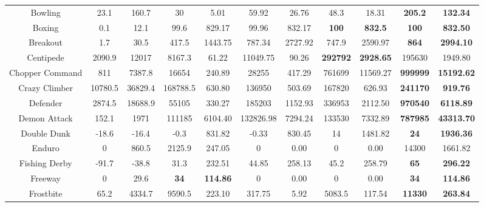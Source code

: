 \documentclass[nohyperref]{article}
\theoremstyle{plain}
\begin{document}
\begin{table}[!hb]
\begin{center}
\begin{tabular}{ |c| c| c| c c| c c| c c| c c|}
 Bowling & 23.1 & 160.7             & 30   & 5.01        & 59.92    & 26.76  & 48.3    & 18.31                             &\textbf{205.2}             &\textbf{132.34}       \\
 Boxing  & 0.1  & 12.1              & 99.6 & 829.17      & 99.96    & 832.17 & \textbf{100} & \textbf{832.5}         &\textbf{100}               &\textbf{832.50}       \\
 Breakout & 1.7 & 30.5              & 417.5 & 1443.75    & 787.34   & 2727.92 & 747.9 & 2590.97                      &\textbf{864}               &\textbf{2994.10}      \\
 Centipede & 2090.9 & 12017         & 8167.3 & 61.22   & 11049.75 & 90.26   & \textbf{292792} & \textbf{2928.65}         &195630                     &1949.80      \\
 Chopper Command & 811 & 7387.8     & 16654 & 240.89 & 28255  & 417.29  & 761699 & 11569.27                         &\textbf{999999}            &\textbf{15192.62}     \\
 Crazy Climber & 10780.5 & 36829.4  & 168788.5 & 630.80 & 136950 & 503.69 & 167820  & 626.93                               &\textbf{241170}            &\textbf{919.76}  \\
 Defender & 2874.5 & 18688.9        & 55105 & 330.27 & 185203 & 1152.93 & 336953  & 2112.50                             &\textbf{970540}            &\textbf{6118.89}     \\
 Demon Attack & 152.1 & 1971        & 111185 & 6104.40 & 132826.98 & 7294.24 & 133530 & 7332.89                       &\textbf{787985}                     &\textbf{43313.70}     \\
 Double Dunk & -18.6 & -16.4        & -0.3   & 831.82  & -0.33     & 830.45  & 14     & 1481.82                      &\textbf{24}                &\textbf{1936.36}     \\
 Enduro      & 0   & 860.5          & 2125.9 & 247.05  & 0       & 0.00     & 0    & 0.00                           &14300                      &1661.82      \\
 Fishing Derby & -91.7 & -38.8      & 31.3 & 232.51  & 44.85   & 258.13    & 45.2   & 258.79                                  &\textbf{65}                &\textbf{296.22}   \\
 Freeway       & 0     & 29.6       & \textbf{34} & \textbf{114.86}  & 0     & 0.00       & 0    & 0.00             &\textbf{34}               &\textbf{114.86}   \\
 Frostbite     & 65.2  & 4334.7     & 9590.5 & 223.10 & 317.75 & 5.92     & 5083.5 & 117.54                                  &\textbf{11330}            &\textbf{263.84}   \\

\end{tabular}
\end{center}
\end{table}
\end{document}
